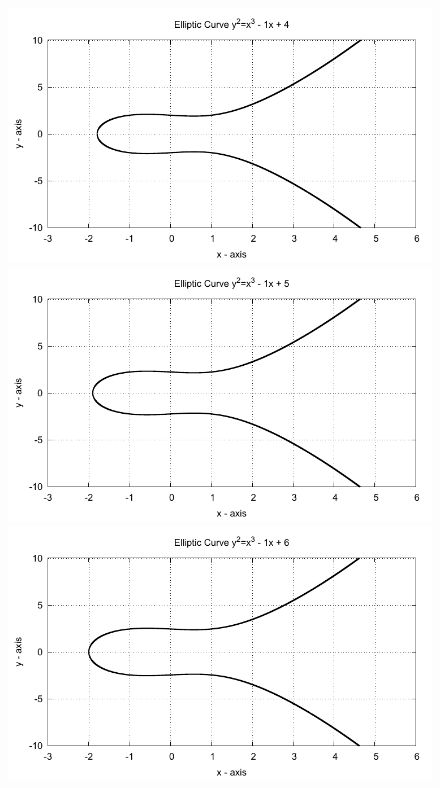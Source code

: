 \begin{figure}[!htbp]

  \begin{minipage}{0.3\textwidth} \centering
    \includegraphics{../Images/ecc_plot/16}
  \end{minipage}
  \begin{minipage}{0.3\textwidth} \centering
    \includegraphics{../Images/ecc_plot/17}
  \end{minipage}
  \begin{minipage}{0.3\textwidth} \centering
    \includegraphics{../Images/ecc_plot/18}
  \end{minipage}
\end{figure}

